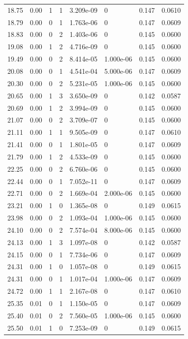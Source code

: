 \documentclass[preview]{standalone}
\begin{document}
{{{\begin{tabular}{L{1.2cm}C{1.2cm} C{0.3cm}C{0.5cm} C{1.4cm}C{1.4cm} C{1.4cm}C{1.4cm}}
  18.75  &  0.00  & 1     &  1 &  3.209e-09  & 0  & 0.147 &  0.0610   \\ 
  18.79  &  0.00  & 0     &  1 &  1.763e-06  & 0  & 0.147 &  0.0609   \\ 
  18.83  &  0.00  & 0     &  2 &  1.403e-06  & 0  & 0.145 &  0.0600   \\ 
  19.08  &  0.00  & 1     &  2 &  4.716e-09  & 0  & 0.145 &  0.0600   \\ 
  19.49  &  0.00  & 0     &  2 &  8.414e-05  & 1.000e-06  & 0.145 &  0.0600   \\ 
  20.08  &  0.00  & 0     &  1 &  4.541e-04  & 5.000e-06  & 0.147 &  0.0609   \\ 
  20.30  &  0.00  & 0     &  2 &  5.231e-05  & 1.000e-06  & 0.145 &  0.0600   \\ 
  20.65  &  0.00  & 1     &  3 &  3.650e-09  & 0  & 0.142 &  0.0587   \\ 
  20.69  &  0.00  & 1     &  2 &  3.994e-09  & 0  & 0.145 &  0.0600   \\ 
  21.07  &  0.00  & 0     &  2 &  3.709e-07  & 0  & 0.145 &  0.0600   \\ 
  21.11  &  0.00  & 1     &  1 &  9.505e-09  & 0  & 0.147 &  0.0610   \\ 
  21.41  &  0.00  & 0     &  1 &  1.801e-05  & 0  & 0.147 &  0.0609   \\ 
  21.79  &  0.00  & 1     &  2 &  4.533e-09  & 0  & 0.145 &  0.0600   \\ 
  22.25  &  0.00  & 0     &  2 &  6.760e-06  & 0  & 0.145 &  0.0600   \\ 
  22.44  &  0.00  & 0     &  1 &  7.052e-11  & 0  & 0.147 &  0.0609   \\ 
  22.71  &  0.00  & 0     &  2 &  1.669e-04  & 2.000e-06  & 0.145 &  0.0600   \\ 
  23.21  &  0.00  & 1     &  0 &  1.365e-08  & 0  & 0.149 &  0.0615   \\ 
  23.98  &  0.00  & 0     &  2 &  1.093e-04  & 1.000e-06  & 0.145 &  0.0600   \\ 
  24.10  &  0.00  & 0     &  2 &  7.574e-04  & 8.000e-06  & 0.145 &  0.0600   \\ 
  24.13  &  0.00  & 1     &  3 &  1.097e-08  & 0  & 0.142 &  0.0587   \\ 
  24.15  &  0.00  & 0     &  1 &  7.734e-06  & 0  & 0.147 &  0.0609   \\ 
  24.31  &  0.00  & 1     &  0 &  1.057e-08  & 0  & 0.149 &  0.0615   \\ 
  24.31  &  0.00  & 0     &  1 &  1.017e-04  & 1.000e-06  & 0.147 &  0.0609   \\ 
  24.72  &  0.00  & 1     &  1 &  2.167e-08  & 0  & 0.147 &  0.0610   \\ 
  25.35  &  0.01  & 0     &  1 &  1.150e-05  & 0  & 0.147 &  0.0609   \\ 
  25.40  &  0.01  & 0     &  2 &  7.560e-05  & 1.000e-06  & 0.145 &  0.0600   \\ 
  25.50  &  0.01  & 1     &  0 &  7.253e-09  & 0  & 0.149 &  0.0615   \\ 
\hline 
\end{tabular} 

}}}
\end{document}
